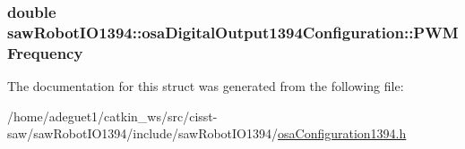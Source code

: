 \hypertarget{structsaw_robot_i_o1394_1_1osa_digital_output1394_configuration_a30e1300d95b514db6b6c92478d8a8dd3}{
\subsubsection[{P\-W\-M\-Frequency}]{\setlength{\rightskip}{0pt plus 5cm}double saw\-Robot\-I\-O1394\-::osa\-Digital\-Output1394\-Configuration\-::\-P\-W\-M\-Frequency}}\label{structsaw_robot_i_o1394_1_1osa_digital_output1394_configuration_a30e1300d95b514db6b6c92478d8a8dd3}


The documentation for this struct was generated from the following file\-:\begin{DoxyCompactItemize}
\item 
/home/adeguet1/catkin\-\_\-ws/src/cisst-\/saw/saw\-Robot\-I\-O1394/include/saw\-Robot\-I\-O1394/\hyperlink{osa_configuration1394_8h}{osa\-Configuration1394.\-h}\end{DoxyCompactItemize}
